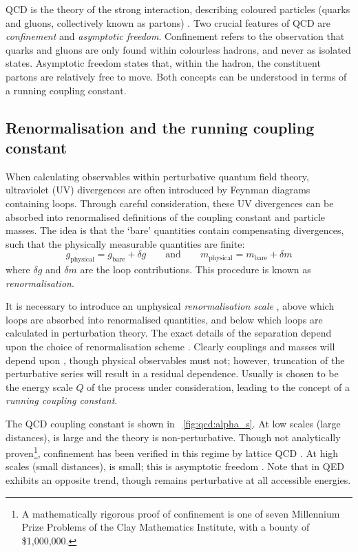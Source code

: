 
QCD is the theory of the strong interaction, describing coloured particles (quarks 
and gluons, collectively known as partons) \cite{Ellis:1996}. Two crucial features of 
QCD are \textit{confinement} and \textit{asymptotic freedom}. Confinement refers to 
the observation that quarks and gluons are only found within colourless hadrons, and 
never as isolated states. Asymptotic freedom states that, within the hadron, the 
constituent partons are relatively free to move. Both concepts can be understood in terms 
of a running coupling constant.



\subsection{Renormalisation and the running coupling constant}
\label{sec:qcd:renormalisation}

When calculating observables within perturbative quantum field theory, ultraviolet (UV) 
divergences are often introduced by Feynman diagrams containing loops. Through careful 
consideration, these UV divergences can be absorbed into renormalised definitions of the 
coupling constant and particle masses. The idea is that the `bare' quantities contain 
compensating divergences, such that the physically measurable quantities are finite:
\begin{equation}
	g_{\text{physical}} = g_{\text{bare}} + \delta g
	\quad\quad\text{and}\quad\quad
	m_{\text{physical}} = m_{\text{bare}} + \delta m
\end{equation}
where $\delta g$ and $\delta m$ are the loop contributions. This procedure is known as 
\textit{renormalisation}.

It is necessary to introduce an unphysical \textit{renormalisation scale} \mur, above 
which loops are absorbed into renormalised quantities, and below which loops are 
calculated in perturbation theory. The exact details of the separation depend upon the 
choice of renormalisation scheme \cite{Aitchison}. Clearly couplings and masses will 
depend upon \mur, though physical observables must not; however, truncation of the 
perturbative series will result in a residual \mur dependence. Usually \mur is chosen to 
be the energy scale $Q$ of the process under consideration, leading to the concept of a 
\textit{running coupling constant}.

The QCD coupling constant \alphaS is shown in \Figure~\ref{fig:qcd:alpha_s}. At low 
scales (large distances), \alphaS is large and the theory is non-perturbative. 
Though not analytically proven\footnote{
	A mathematically rigorous proof of confinement is one of seven Millennium Prize 
	Problems of the Clay Mathematics Institute, with a bounty of \$1,000,000.
}, confinement has been verified in this regime by lattice QCD \cite{Wilson:1974}. 
At high scales (small distances), \alphaS is small; this is asymptotic freedom 
\cite{Gross:1973,Politzer:1973}. Note that \alphaEM in QED exhibits an opposite 
trend, though remains perturbative at all accessible energies.

